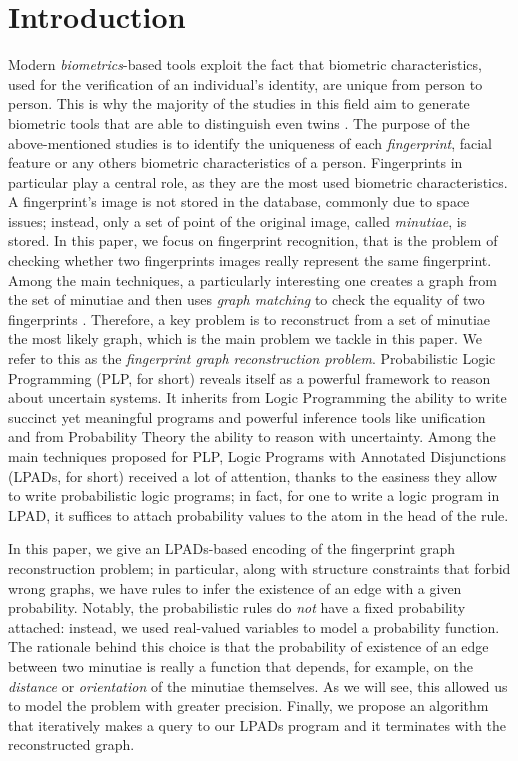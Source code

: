 \documentclass[8pt]{article}
\begin{document}
\section{Introduction}
Modern \textit{biometrics}-based tools exploit the fact that biometric
characteristics, used for the verification of an individual’s identity, are
unique from person to person\cite{maltoni2009handbook}.  This is why the
majority of the studies in this
field aim to generate biometric tools that are able to distinguish even twins
\cite{jain2001twin,jain2002similarity}.
%
The purpose of the above-mentioned studies is to identify the uniqueness of each
\textit{fingerprint}, facial feature or any others biometric characteristics of
a person. Fingerprints in particular play a central role, as they are
 the most used biometric characteristics. A fingerprint's image is not
stored in the database, commonly due to space issues; instead, only a set of
point of the original image, called \emph{minutiae}, is stored.
In this paper, we focus on fingerprint recognition, that is the problem of
checking whether two fingerprints images really represent the same fingerprint.
%
Among the main techniques, a particularly interesting one creates a graph from
the set of minutiae and then uses \emph{graph matching} to check the equality
of two fingerprints \cite{isenor1986fingerprint}. Therefore, a key problem is
to reconstruct from a set of minutiae the most likely graph, which is the main
problem we tackle in this paper. We refer to this as the \emph{fingerprint
graph reconstruction problem}.
Probabilistic Logic Programming (PLP, for short) reveals itself as a powerful
framework to reason about uncertain systems. It inherits from Logic Programming
the ability to write succinct yet meaningful programs and powerful inference
tools like unification and from Probability Theory the ability to reason
with uncertainty.
Among the main techniques proposed for PLP, Logic Programs with Annotated
Disjunctions (LPADs, for short) received a lot of attention, thanks to the
easiness they allow to write probabilistic logic programs; in fact, for one to
write a logic program in LPAD, it suffices to attach probability values to
the atom in the head of the rule.

In this paper, we give an LPADs-based encoding of the fingerprint graph
reconstruction problem; in particular, along with structure constraints that
forbid wrong graphs, we have rules to infer the existence of an edge with
a given probability. Notably, the probabilistic rules do \emph{not} have
a fixed probability attached: instead, we used real-valued variables to model
a probability function. The rationale behind this choice is that the
probability of existence of an edge between two minutiae is really a function
that depends, for example, on the \emph{distance} or \emph{orientation} of the minutiae themselves.
As we
will see, this allowed us to model the problem with greater precision.
Finally, we propose an algorithm that iteratively makes a query to our LPADs
program and it terminates with the reconstructed graph. 
\end{document}

